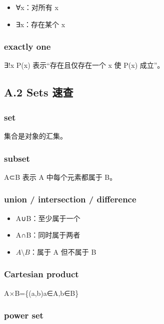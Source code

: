 \documentclass[
  11pt,
]{article}
\providecommand{\tightlist}{%
  \setlength{\itemsep}{0pt}\setlength{\parskip}{0pt}}
\begin{document}
\begin{itemize}
\tightlist
\item
  ∀x：对所有 x
\item
  ∃x：存在某个 x
\end{itemize}

\subsubsection{exactly one}\label{exactly-one}

∃!x P(x) 表示``存在且仅存在一个 x 使 P(x) 成立''。

\subsection{A.2 Sets 速查}\label{a.2-sets-ux901fux67e5}

\subsubsection{set}\label{set}

集合是对象的汇集。

\subsubsection{subset}\label{subset}

A⊂B 表示 A 中每个元素都属于 B。

\subsubsection{union / intersection /
difference}\label{union-intersection-difference}

\begin{itemize}
\tightlist
\item
  A∪B：至少属于一个
\item
  A∩B：同时属于两者
\item
  \(A\setminus B\)：属于 A 但不属于 B
\end{itemize}

\subsubsection{Cartesian product}\label{cartesian-product}

A×B=\{(a,b)\textbar a∈A,b∈B\}

\subsubsection{power set}\label{power-set}
\end{document}
